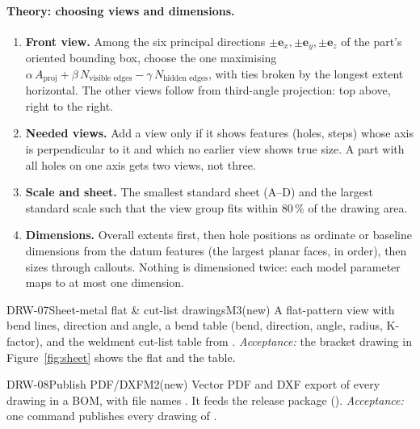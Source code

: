\paragraph{Theory: choosing views and dimensions.}
\begin{enumerate}
  \item \textbf{Front view.} Among the six principal directions $\pm\mathbf e_x,\pm\mathbf e_y,\pm\mathbf e_z$
        of the part's oriented bounding box, choose the one maximising
        $\alpha\,A_{\text{proj}}+\beta\,N_{\text{visible edges}}-\gamma\,N_{\text{hidden edges}}$, with
        ties broken by the longest extent horizontal. The other views follow from third-angle
        projection: top above, right to the right.
  \item \textbf{Needed views.} Add a view only if it shows features (holes, steps) whose axis is
        perpendicular to it and which no earlier view shows true size. A part with all holes on one axis gets
        two views, not three.
  \item \textbf{Scale and sheet.} The smallest standard sheet (A--D) and the largest standard scale such that
        the view group fits within 80\,\% of the drawing area.
  \item \textbf{Dimensions.} Overall extents first, then hole positions as ordinate or baseline dimensions
        from the datum features (the largest planar faces, in order), then sizes through callouts. Nothing is
        dimensioned twice: each model parameter maps to at most one dimension.
\end{enumerate}

\begin{epic}{DRW-07}{Sheet-metal flat \& cut-list drawings}{M3}{\stTodo}{(new)}
A flat-pattern view with bend lines, direction and angle, a bend table (bend, direction, angle, radius,
K-factor), and the weldment cut-list table from .
\emph{Acceptance:} the bracket drawing in Figure~\ref{fig:sheet} shows the flat and the table.
\end{epic}

\begin{epic}{DRW-08}{Publish PDF/DXF}{M2}{\stTodo}{(new)}
Vector PDF and DXF export of every drawing in a BOM, with file names . It feeds the
release package ().
\emph{Acceptance:} one command publishes every drawing of .
\end{epic}
